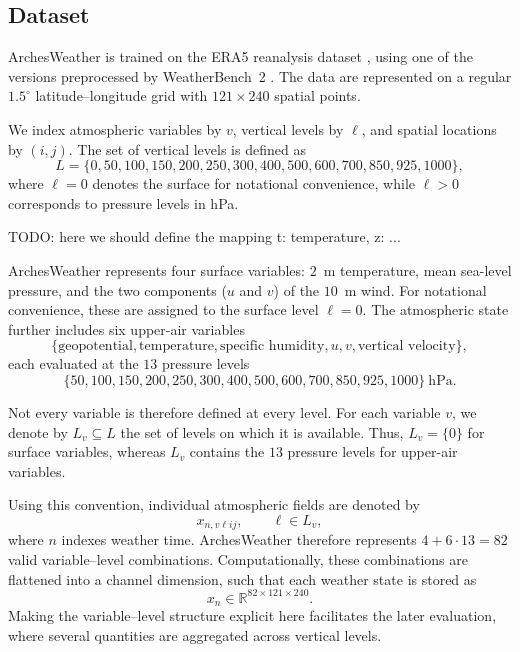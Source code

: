 \subsection{Dataset}
\label{sec:archesweather-dataset}

ArchesWeather is trained on the ERA5 reanalysis dataset
\parencite{hersbach2020era5}, using one of the versions preprocessed by
WeatherBench~2 \parencite{rasp2024weatherbench2}.
The data are represented on a regular $1.5^\circ$ latitude--longitude grid
with $121\times240$ spatial points.

We index atmospheric variables by $v$, vertical levels by $\ell$, and spatial
locations by $(i,j)$. The set of vertical levels is defined as
\[
    L
    =
    \{0,50,100,150,200,250,300,400,500,600,700,850,925,1000\},
\]
where $\ell=0$ denotes the surface for notational convenience, while
$\ell>0$ corresponds to pressure levels in hPa.

TODO: here we should define the mapping t: temperature, z: ...

ArchesWeather represents four surface variables: $2$~m temperature, mean
sea-level pressure, and the two components ($u$ and $v$) of the $10$~m wind.
For notational convenience, these are assigned to the surface level $\ell=0$.
The atmospheric state further includes six upper-air variables
\[
    \{
        \text{geopotential},
        \text{temperature},
        \text{specific humidity},
        u,
        v,
        \text{vertical velocity}
    \},
\]
each evaluated at the $13$ pressure levels
\[
    \{50,100,150,200,250,300,400,500,600,700,850,925,1000\}
    \ \mathrm{hPa}.
\]

Not every variable is therefore defined at every level. For each variable
$v$, we denote by $L_v\subseteq L$ the set of levels on
which it is available. Thus, $L_v=\{0\}$ for surface variables,
whereas $L_v$ contains the $13$ pressure levels for upper-air
variables.

Using this convention, individual atmospheric fields are denoted by
\[
    x_{n,v\ell ij},
    \qquad
    \ell\in L_v,
\]
where $n$ indexes weather time. ArchesWeather therefore represents
$4+6\cdot13=82$ valid variable--level combinations. Computationally, these
combinations are flattened into a channel dimension, such that each weather
state is stored as
\[
    x_n \in \mathbb{R}^{82\times121\times240}.
\]
Making the variable--level structure explicit here facilitates the later evaluation, where several quantities are aggregated across vertical levels.

